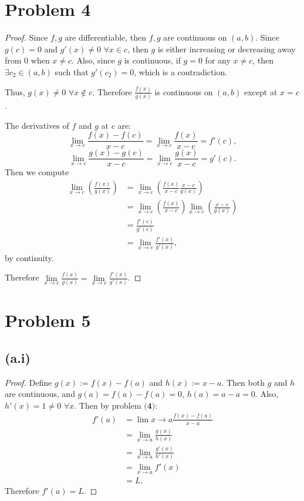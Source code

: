 \documentclass{article}
\begin{document}
\section*{Problem 4}
\begin{proof}
	Since $f, g$ are differentiable, then $f, g$ are continuous on $(a, b)$. Since $g(c) = 0$ and $g'(x) \neq 0$ $\forall x \in c$, then $g$ is either increasing or decreasing away from $0$ when $x \neq c$. Also, since $g$ is continuous, if $g=0$ for any $x \neq c$, then $\exists c_2 \in (a, b)$ such that $g'(c_2) = 0$, which is a contradiction.
	
	Thus, $g(x) \neq 0$ $\forall x \notin c$. Therefore $\frac{f(x)}{g(x)}$ is continuous on $(a, b)$ except at $x = c$.
	
	The derivatives of $f$ and $g$ at $c$ are: 
	\begin{equation}
		\lim\limits_{x \to c} \frac{f(x) - f(c)}{x - c} = \lim\limits_{x \to c} \frac{f(x)}{x - c} = f'(c),
	\end{equation}
	\begin{equation}
		\lim\limits_{x \to c} \frac{g(x) - g(c)}{x - c} = \lim\limits_{x \to c} \frac{g(x)}{x - c} = g'(c).
	\end{equation}
	Then we compute
	\begin{align}
		\lim\limits_{x \to c} \left(\frac{f(x)}{g(x)}\right) &= \lim\limits_{x \to c} \left(\frac{f(x)}{x - c} \frac{x-c}{g(x)}\right) \\
		&= \lim\limits_{x \to c} \left(\frac{f(x)}{x - c}\right) \lim\limits_{x \to c} \left(\frac{x - c}{g(x)}\right) \\
		&= \frac{f'(c)}{g'(c)} \\
		&= \lim\limits_{x \to c}\frac{f'(x)}{g'(x)},
	\end{align}
	by continuity. 
	
	Therefore $\lim \limits_{x \to c} \frac{f(x)}{g(x)} = \lim\limits_{x \to c} \frac{f'(x)}{g'(x)}$.
\end{proof}
\section*{Problem 5}
\subsection*{(a.i)}
\begin{proof}
	Define $g(x) := f(x) - f(a)$ and $h(x) := x - a$. Then both $g$ and $h$ are continuous, and $g(a) = f(a) - f(a) = 0$, $h(a) = a - a = 0$. Also, $h'(x) = 1 \neq 0$ $\forall x$. Then by problem $\textbf{(4)}$:
	\begin{align}
		f'(a) &= \lim\limits{x \to a} \frac{f(x) - f(a)}{x - a} \\
		&= \lim\limits_{x \to a} \frac{g(x)}{h(x)} \\
		&= \lim\limits_{x \to a} \frac{g'(x)}{h'(x)} \\
		&= \lim\limits_{x \to a} f'(x) \\
		&= L.
	\end{align}
	Therefore $f'(a) = L$.
\end{proof}
\end{document}
